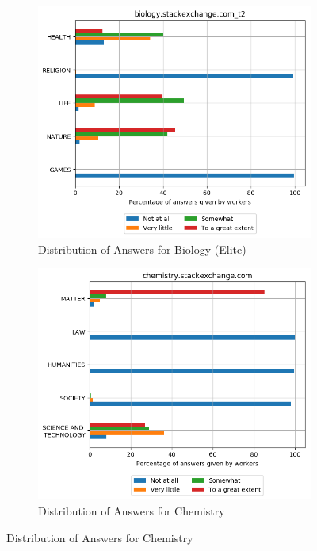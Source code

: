 \begin{figure}[H]
     \begin{subfigure}{0.5\textwidth}
    \centering
        \includegraphics[width=1\linewidth]{imgs/crowd-results/biology_stackexchange_com_t2}
        \caption{Distribution of Answers for Biology (Elite)}
        \label{fig:crowd-biology-2}
    \end{subfigure}%
    \begin{subfigure}{0.5\textwidth}
    \centering
        \includegraphics[width=1\linewidth]{imgs/crowd-results/chemistry_stackexchange_com}
        \caption{Distribution of Answers for Chemistry}
        \label{fig:crowd-chemistry}
    \end{subfigure}


\end{figure}
